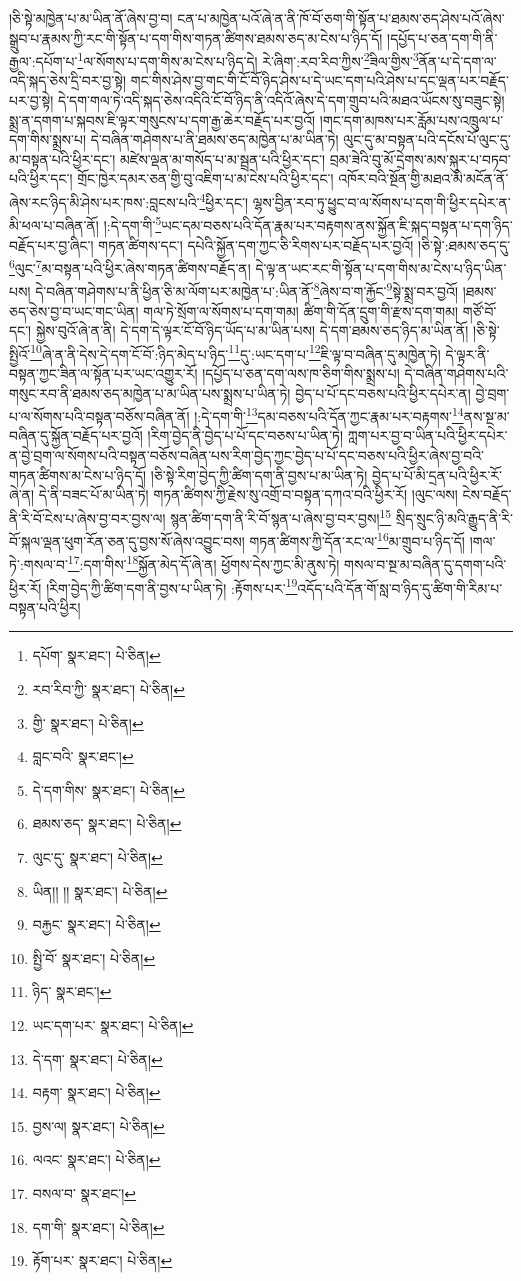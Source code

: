 །ཅི་སྟེ་མཁྱེན་པ་མ་ཡིན་ནོ་ཞེས་བྱ་བ། ངན་པ་མཁྱེན་པའོ་ཞེ་ན་ནི་ཁོ་བོ་ཅག་གི་སྟོན་པ་ཐམས་ཅད་ཤེས་པའོ་ཞེས་སྒྲུབ་པ་རྣམས་ཀྱི་རང་གི་སྟོན་པ་དག་གིས་གཏན་ཚིགས་ཐམས་ཅད་མ་ངེས་པ་ཉིད་དོ། །དཔྱོད་པ་ཅན་དག་གི་ནི་རྒྱལ་:དཔོག་པ་\footnote{དཔོག་  སྣར་ཐང་།  པེ་ཅིན། }ལ་སོགས་པ་དག་གིས་མ་ངེས་པ་ཉིད་དེ། རེ་ཞིག་:རབ་རིབ་ཀྱིས་\footnote{རབ་རིབ་ཀྱི་  སྣར་ཐང་།  པེ་ཅིན། }ཟིལ་གྱིས་\footnote{གྱི་  སྣར་ཐང་།  པེ་ཅིན། }ནོན་པ་དེ་དག་ལ་འདི་སྐད་ཅེས་དྲི་བར་བྱ་སྟེ། གང་གིས་ཤེས་བྱ་གང་གི་ངོ་བོ་ཉིད་ཤེས་པ་དེ་ཡང་དག་པའི་ཤེས་པ་དང་ལྡན་པར་བརྗོད་པར་བྱ་སྟེ། དེ་དག་གལ་ཏེ་འདི་སྐད་ཅེས་འདིའི་ངོ་བོ་ཉིད་ནི་འདིའོ་ཞེས་དེ་དག་གྲུབ་པའི་མཐའ་ཡོངས་སུ་བཟུང་སྟེ། སྨྲ་ན་དགག་པ་སྐབས་ཇི་ལྟར་གསུངས་པ་དག་རྒྱ་ཆེར་བརྗོད་པར་བྱའོ། །གང་དག་མཁས་པར་རློམ་པས་འཁྲུལ་པ་དག་གིས་སྨྲས་པ། དེ་བཞིན་གཤེགས་པ་ནི་ཐམས་ཅད་མཁྱེན་པ་མ་ཡིན་ཏེ། ལུང་དུ་མ་བསྟན་པའི་དངོས་པོ་ལུང་དུ་མ་བསྟན་པའི་ཕྱིར་དང་། མཛེས་ལྡན་མ་གསོད་པ་མ་སྦྲན་པའི་ཕྱིར་དང་། བྲམ་ཟེའི་བུ་མོ་དྲེགས་མས་སྐུར་པ་བཏབ་པའི་ཕྱིར་དང་། གྲོང་ཁྱེར་དམར་ཅན་གྱི་བུ་འཇིག་པ་མ་ངེས་པའི་ཕྱིར་དང་། འཁོར་བའི་སྔོན་གྱི་མཐའ་མི་མངོན་ནོ་ཞེས་རང་ཉིད་མི་ཤེས་པར་ཁས་:བླངས་པའི་\footnote{བླང་བའི་  སྣར་ཐང་། }ཕྱིར་དང་། ལྷས་བྱིན་རབ་ཏུ་ཕྱུང་བ་ལ་སོགས་པ་དག་གི་ཕྱིར་དཔེར་ན་མི་ཕལ་པ་བཞིན་ནོ། །:དེ་དག་གི་\footnote{དེ་དག་གིས་  སྣར་ཐང་།  པེ་ཅིན། }ཡང་དམ་བཅས་པའི་དོན་རྣམ་པར་བརྟགས་ནས་སྐྱོན་ཇི་སྐད་བསྟན་པ་དག་ཉིད་བརྗོད་པར་བྱ་ཞིང་། གཏན་ཚིགས་དང་། དཔེའི་སྐྱོན་དག་ཀྱང་ཅི་རིགས་པར་བརྗོད་པར་བྱའོ། །ཅི་སྟེ་:ཐམས་ཅད་དུ་\footnote{ཐམས་ཅད་  སྣར་ཐང་།  པེ་ཅིན། }ལུང་\footnote{ལུང་དུ་  སྣར་ཐང་།  པེ་ཅིན། }མ་བསྟན་པའི་ཕྱིར་ཞེས་གཏན་ཚིགས་བརྗོད་ན། དེ་ལྟ་ན་ཡང་རང་གི་སྟོན་པ་དག་གིས་མ་ངེས་པ་ཉིད་ཡིན་པས། དེ་བཞིན་གཤེགས་པ་ནི་ཕྱིན་ཅི་མ་ལོག་པར་མཁྱེན་པ་:ཡིན་ནོ་\footnote{ཡིན།། །།  སྣར་ཐང་།  པེ་ཅིན། }ཞེས་བ་ག་རྐྱོང་\footnote{བརྐྱང་  སྣར་ཐང་།  པེ་ཅིན། }སྟེ་སྨྲ་བར་བྱའོ། །ཐམས་ཅད་ཅེས་བྱ་བ་ཡང་གང་ཡིན། གལ་ཏེ་སྲོག་ལ་སོགས་པ་དག་གམ། ཚིག་གི་དོན་དྲུག་གི་རྫས་དག་གམ། གཙོ་བོ་དང་། སྐྱེས་བུའོ་ཞེ་ན་ནི། དེ་དག་དེ་ལྟར་ངོ་བོ་ཉིད་ཡོད་པ་མ་ཡིན་པས། དེ་དག་ཐམས་ཅད་ཉིད་མ་ཡིན་ནོ། །ཅི་སྟེ་སྤྱིའོ་\footnote{སྤྱི་བོ་  སྣར་ཐང་།  པེ་ཅིན། }ཞེ་ན་ནི་དེས་དེ་དག་ངོ་བོ་:ཉིད་མེད་པ་ཉིད་\footnote{ཉིད་  སྣར་ཐང་། }དུ་:ཡང་དག་པ་\footnote{ཡང་དག་པར་  སྣར་ཐང་།  པེ་ཅིན། }ཇི་ལྟ་བ་བཞིན་དུ་མཁྱེན་ཏེ། དེ་ལྟར་ནི་བསྟན་ཀྱང་ཟིན་ལ་སྟོན་པར་ཡང་འགྱུར་རོ། །དཔྱོད་པ་ཅན་དག་ལས་ཁ་ཅིག་གིས་སྨྲས་པ། དེ་བཞིན་གཤེགས་པའི་གསུང་རབ་ནི་ཐམས་ཅད་མཁྱེན་པ་མ་ཡིན་པས་སྨྲས་པ་ཡིན་ཏེ། བྱེད་པ་པོ་དང་བཅས་པའི་ཕྱིར་དཔེར་ན། བྱེ་བྲག་པ་ལ་སོགས་པའི་བསྟན་བཅོས་བཞིན་ནོ། །:དེ་དག་གི་\footnote{དེ་དག་  སྣར་ཐང་།  པེ་ཅིན། }དམ་བཅས་པའི་དོན་ཀྱང་རྣམ་པར་བརྟགས་\footnote{བརྟག་  སྣར་ཐང་།  པེ་ཅིན། }ནས་སྔ་མ་བཞིན་དུ་སྐྱོན་བརྗོད་པར་བྱའོ། །རིག་བྱེད་ནི་བྱེད་པ་པོ་དང་བཅས་པ་ཡིན་ཏེ། ཀླག་པར་བྱ་བ་ཡིན་པའི་ཕྱིར་དཔེར་ན་བྱེ་བྲག་ལ་སོགས་པའི་བསྟན་བཅོས་བཞིན་པས་རིག་བྱེད་ཀྱང་བྱེད་པ་པོ་དང་བཅས་པའི་ཕྱིར་ཞེས་བྱ་བའི་གཏན་ཚིགས་མ་ངེས་པ་ཉིད་དོ། །ཅི་སྟེ་རིག་བྱེད་ཀྱི་ཚིག་དག་ནི་བྱས་པ་མ་ཡིན་ཏེ། བྱེད་པ་པོ་མི་དྲན་པའི་ཕྱིར་རོ་ཞེ་ན། དེ་ནི་བཟང་པོ་མ་ཡིན་ཏེ། གཏན་ཚིགས་ཀྱི་རྗེས་སུ་འགྲོ་བ་བསྟན་དཀའ་བའི་ཕྱིར་རོ། །ལུང་ལས། ངེས་བརྗོད་ནི་རི་བོ་ངེས་པ་ཞེས་བྱ་བར་བྱས་ལ། སྙན་ཚིག་དག་ནི་རི་བོ་སྙན་པ་ཞེས་བྱ་བར་བྱས།\footnote{བྱས་ལ།  སྣར་ཐང་།  པེ་ཅིན། } སྲིད་སྲུང་ཉི་མའི་རྒྱུད་ནི་རི་བོ་སྐལ་ལྡན་ཕུག་རོན་ཅན་དུ་བྱས་སོ་ཞེས་འབྱུང་བས། གཏན་ཚིགས་ཀྱི་དོན་རང་ལ་\footnote{ལའང་  སྣར་ཐང་།  པེ་ཅིན། }མ་གྲུབ་པ་ཉིད་དོ། །གལ་ཏེ་:གསལ་བ་\footnote{བསལ་བ་  སྣར་ཐང་། }:དག་གིས་\footnote{དག་གི་  སྣར་ཐང་།  པེ་ཅིན། }སྐྱོན་མེད་དོ་ཞེ་ན། ཕྱོགས་དེས་ཀྱང་མི་ནུས་ཏེ། གསལ་བ་སྔ་མ་བཞིན་དུ་དགག་པའི་ཕྱིར་རོ། །རིག་བྱེད་ཀྱི་ཚིག་དག་ནི་བྱས་པ་ཡིན་ཏེ། :རྟོགས་པར་\footnote{རྟོག་པར་  སྣར་ཐང་།  པེ་ཅིན། }འདོད་པའི་དོན་གོ་སླ་བ་ཉིད་དུ་ཚིག་གི་རིམ་པ་བསྟན་པའི་ཕྱིར། 